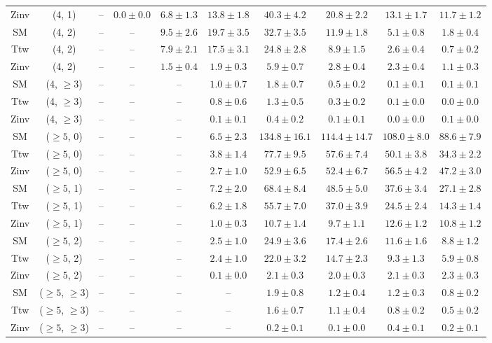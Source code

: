 \begin{table}[h!]
{\begin{tabular}{cccccccccc}
	Zinv & (4, 1) & -- & $0.0\pm 0.0$ & $6.8\pm 1.3$ & $13.8\pm 1.8$ & $40.3\pm 4.2$ & $20.8\pm 2.2$ & $13.1\pm 1.7$ & $11.7\pm 1.2$ \\[0.5ex] 
	SM & (4, 2) & -- & -- & $9.5\pm 2.6$ & $19.7\pm 3.5$ & $32.7\pm 3.5$ & $11.9\pm 1.8$ & $5.1\pm 0.8$ & $1.8\pm 0.4$ \\[0.5ex] 
	Ttw & (4, 2) & -- & -- & $7.9\pm 2.1$ & $17.5\pm 3.1$ & $24.8\pm 2.8$ & $8.9\pm 1.5$ & $2.6\pm 0.4$ & $0.7\pm 0.2$ \\[0.5ex] 
	Zinv & (4, 2) & -- & -- & $1.5\pm 0.4$ & $1.9\pm 0.3$ & $5.9\pm 0.7$ & $2.8\pm 0.4$ & $2.3\pm 0.4$ & $1.1\pm 0.3$ \\[0.5ex] 
	SM & (4, $\ge3$) & -- & -- & -- & $1.0\pm 0.7$ & $1.8\pm 0.7$ & $0.5\pm 0.2$ & $0.1\pm 0.1$ & $0.1\pm 0.1$ \\[0.5ex] 
	Ttw & (4, $\ge3$) & -- & -- & -- & $0.8\pm 0.6$ & $1.3\pm 0.5$ & $0.3\pm 0.2$ & $0.1\pm 0.0$ & $0.0\pm 0.0$ \\[0.5ex] 
	Zinv & (4, $\ge3$) & -- & -- & -- & $0.1\pm 0.1$ & $0.4\pm 0.2$ & $0.1\pm 0.1$ & $0.0\pm 0.0$ & $0.1\pm 0.0$ \\[0.5ex] 
	SM & ($\ge5$, 0) & -- & -- & -- & $6.5\pm 2.3$ & $134.8\pm 16.1$ & $114.4\pm 14.7$ & $108.0\pm 8.0$ & $88.6\pm 7.9$ \\[0.5ex] 
	Ttw & ($\ge5$, 0) & -- & -- & -- & $3.8\pm 1.4$ & $77.7\pm 9.5$ & $57.6\pm 7.4$ & $50.1\pm 3.8$ & $34.3\pm 2.2$ \\[0.5ex] 
	Zinv & ($\ge5$, 0) & -- & -- & -- & $2.7\pm 1.0$ & $52.9\pm 6.5$ & $52.4\pm 6.7$ & $56.5\pm 4.2$ & $47.2\pm 3.0$ \\[0.5ex] 
	SM & ($\ge5$, 1) & -- & -- & -- & $7.2\pm 2.0$ & $68.4\pm 8.4$ & $48.5\pm 5.0$ & $37.6\pm 3.4$ & $27.1\pm 2.8$ \\[0.5ex] 
	Ttw & ($\ge5$, 1) & -- & -- & -- & $6.2\pm 1.8$ & $55.7\pm 7.0$ & $37.0\pm 3.9$ & $24.5\pm 2.4$ & $14.3\pm 1.4$ \\[0.5ex] 
	Zinv & ($\ge5$, 1) & -- & -- & -- & $1.0\pm 0.3$ & $10.7\pm 1.4$ & $9.7\pm 1.1$ & $12.6\pm 1.2$ & $10.8\pm 1.2$ \\[0.5ex] 
	SM & ($\ge5$, 2) & -- & -- & -- & $2.5\pm 1.0$ & $24.9\pm 3.6$ & $17.4\pm 2.6$ & $11.6\pm 1.6$ & $8.8\pm 1.2$ \\[0.5ex] 
	Ttw & ($\ge5$, 2) & -- & -- & -- & $2.4\pm 1.0$ & $22.0\pm 3.2$ & $14.7\pm 2.3$ & $9.3\pm 1.3$ & $5.9\pm 0.8$ \\[0.5ex] 
	Zinv & ($\ge5$, 2) & -- & -- & -- & $0.1\pm 0.0$ & $2.1\pm 0.3$ & $2.0\pm 0.3$ & $2.1\pm 0.3$ & $2.3\pm 0.3$ \\[0.5ex] 
	SM & ($\ge5$, $\ge3$) & -- & -- & -- & -- & $1.9\pm 0.8$ & $1.2\pm 0.4$ & $1.2\pm 0.3$ & $0.8\pm 0.2$ \\[0.5ex] 
	Ttw & ($\ge5$, $\ge3$) & -- & -- & -- & -- & $1.6\pm 0.7$ & $1.1\pm 0.4$ & $0.8\pm 0.2$ & $0.5\pm 0.2$ \\[0.5ex] 
	Zinv & ($\ge5$, $\ge3$) & -- & -- & -- & -- & $0.2\pm 0.1$ & $0.1\pm 0.0$ & $0.4\pm 0.1$ & $0.2\pm 0.1$ \\[0.5ex] 
	\hline
	\hline
\end{tabular}}
\end{table}

